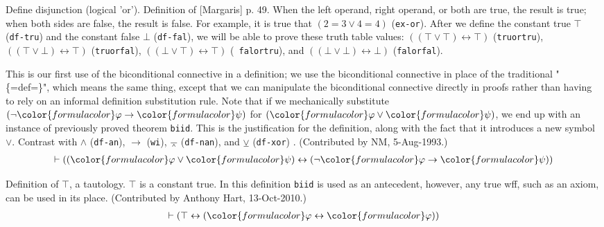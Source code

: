 \begin{lemma} Define disjunction (logical 'or').  Definition
of [Margaris] p. 49.  When
     the left operand, right operand, or both are true, the result is true;
     when both sides are false, the result is false.  For example, it is true
     that $( 2 = 3 \vee 4 = 4 )$ ({\tt ex-or}).  After we define the constant
     true $\top$ ({\tt df-tru}) and the constant false $\bot$ ({\tt df-fal}),
we
     will be able to prove these truth table values:
     $( ( \top \vee \top ) \leftrightarrow \top )$ ({\tt truortru}), $( ( \top
\vee \bot ) \leftrightarrow \top )$
     ({\tt truorfal}), $( ( \bot \vee \top ) \leftrightarrow \top )$ ({\tt
falortru}), and
     $( ( \bot \vee \bot ) \leftrightarrow \bot )$ ({\tt falorfal}).

     This is our first use of the biconditional connective in a definition; we
     use the biconditional connective in place of the traditional "\{=def=\}",
     which means the same thing, except that we can manipulate the
     biconditional connective directly in proofs rather than having to rely on
     an informal definition substitution rule.  Note that if we mechanically
     substitute $( \lnot {\color{formulacolor}\varphi} \rightarrow
{\color{formulacolor}\psi} )$ for $( {\color{formulacolor}\varphi} \vee
{\color{formulacolor}\psi} )$, we end up with an
     instance of previously proved theorem {\tt biid}.  This is the
justification
     for the definition, along with the fact that it introduces a new symbol
     $\vee$.  Contrast with $\wedge$ ({\tt df-an}), $\rightarrow$ ({\tt wi}),
$\barwedge$
     ({\tt df-nan}), and $\veebar$ ({\tt df-xor}) .  (Contributed by NM,
     5-Aug-1993.)
\begin{align}
\vdash ( ( {\color{formulacolor}\varphi} \vee {\color{formulacolor}\psi} )
    \leftrightarrow ( \lnot {\color{formulacolor}\varphi} \rightarrow
    {\color{formulacolor}\psi} ) )\label{df-or}
\end{align}
\end{lemma}


\begin{lemma} Definition of $\top$, a tautology. $\top$ is a
constant true.  In this
     definition {\tt biid} is used as an antecedent, however, any true wff,
such as
     an axiom, can be used in its place.  (Contributed by Anthony Hart,
     13-Oct-2010.)
\begin{align}
\vdash ( \top \leftrightarrow ( {\color{formulacolor}\varphi} \leftrightarrow
    {\color{formulacolor}\varphi} ) )\label{df-tru}
\end{align}
\end{lemma}


